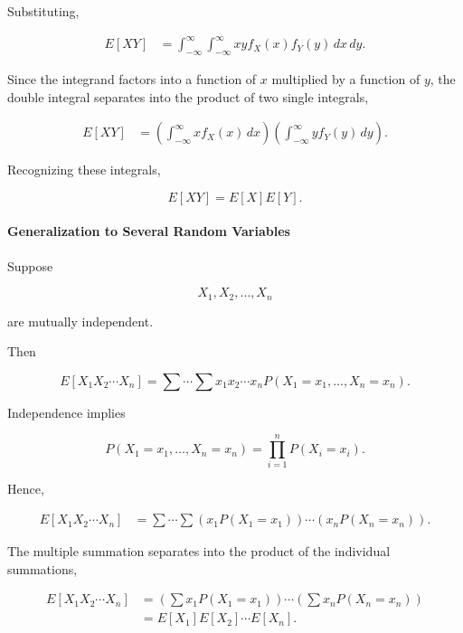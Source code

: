 \documentclass[11pt]{article}
\begin{document}
\begin{mdframed}[
		linewidth=0.8pt,
		roundcorner=6pt,
		backgroundcolor=gray!5,
		linecolor=gray!60,
		innertopmargin=10pt,
		innerbottommargin=10pt,
		innerleftmargin=10pt,
		innerrightmargin=10pt
		]
		Substituting,
		
		\[
		\begin{aligned}
			E[XY]
			&=
			\int_{-\infty}^{\infty}
			\int_{-\infty}^{\infty}
			xy
			f_X(x)
			f_Y(y)
			\,dx\,dy.
		\end{aligned}
		\]
		
		Since the integrand factors into a function of \(x\) multiplied by a
		function of \(y\), the double integral separates into the product of two
		single integrals,
		
		\[
		\begin{aligned}
			E[XY]
			&=
			\left(
			\int_{-\infty}^{\infty}
			xf_X(x)\,dx
			\right)
			\left(
			\int_{-\infty}^{\infty}
			yf_Y(y)\,dy
			\right).
		\end{aligned}
		\]
		
		Recognizing these integrals,
		
		\[
		\boxed{
			E[XY]
			=
			E[X]E[Y].
		}
		\]
		
		\bigskip
		
		\paragraph{Generalization to Several Random Variables}
		
		Suppose
		
		\[
		X_1,X_2,\ldots,X_n
		\]
		
		are mutually independent.
		
		Then
		
		\[
		E[X_1X_2\cdots X_n]
		=
		\sum\cdots\sum
		x_1x_2\cdots x_n
		P(X_1=x_1,\ldots,X_n=x_n).
		\]
		
		Independence implies
		
		\[
		P(X_1=x_1,\ldots,X_n=x_n)
		=
		\prod_{i=1}^{n}
		P(X_i=x_i).
		\]
		
		Hence,
		
		\[
		\begin{aligned}
			E[X_1X_2\cdots X_n]
			&=
			\sum\cdots\sum
			\left(
			x_1P(X_1=x_1)
			\right)
			\cdots
			\left(
			x_nP(X_n=x_n)
			\right).
		\end{aligned}
		\]
		
		The multiple summation separates into the product of the individual
		summations,
		
		\[
		\begin{aligned}
			E[X_1X_2\cdots X_n]
			&=
			\left(
			\sum x_1P(X_1=x_1)
			\right)
			\cdots
			\left(
			\sum x_nP(X_n=x_n)
			\right)
			\\[0.3cm]
			&=
			E[X_1]
			E[X_2]
			\cdots
			E[X_n].
		\end{aligned}
		\]
		

\end{mdframed}
\end{document}
